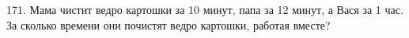 171. Мама чистит ведро картошки за 10 минут, папа за 12 минут, а Вася за 1 час. За сколько времени они почистят ведро картошки, работая вместе?\\
